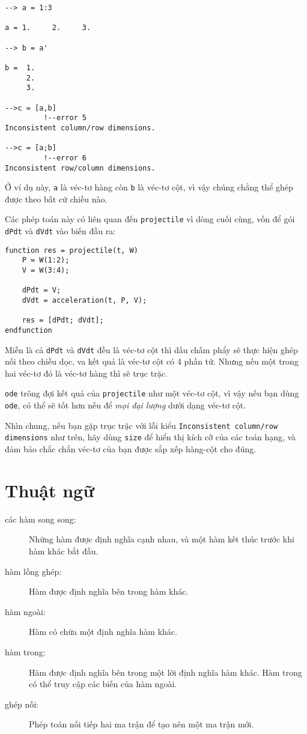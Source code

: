 \documentclass[12pt]{book}
\begin{document}
\begin{verbatim}
--> a = 1:3

a = 1.     2.     3.

--> b = a'

b =  1.
     2.
     3.

-->c = [a,b]
         !--error 5 
Inconsistent column/row dimensions.

-->c = [a;b]
         !--error 6 
Inconsistent row/column dimensions.
\end{verbatim}
%
Ở ví dụ này, {\tt a} là véc-tơ hàng còn {\tt b} là véc-tơ cột,
vì vậy chúng chẳng thể ghép được theo bất cứ chiều nào.

Các phép toán này có liên quan đến {\tt projectile} vì dòng cuối
cùng, vốn để gói {\tt dPdt} và {\tt dVdt} vào biến đầu ra:

\begin{verbatim}
function res = projectile(t, W)
    P = W(1:2);
    V = W(3:4);

    dPdt = V;                          
    dVdt = acceleration(t, P, V);

    res = [dPdt; dVdt];
endfunction
\end{verbatim}
%
Miễn là cả {\tt dPdt} và {\tt dVdt} đều là véc-tơ cột thì 
dấu chấm phẩy sẽ thực hiện ghép nối theo chiều dọc, va
kết quả là véc-tơ cột có 4 phần tử. Nhưng nếu một trong
hai véc-tơ đó là véc-tơ hàng thì sẽ trục trặc. 

{\tt ode} trông đợi kết quả của {\tt projectile} như một
véc-tơ cột, vì vậy nếu bạn dùng {\tt ode}, có thể sẽ tốt hơn
nếu để {\em mọi đại lượng} dưới dạng véc-tơ cột.

Nhìn chung, nếu bạn gặp trục trặc với lỗi kiểu 
{\tt Inconsistent column/row dimensions} như trên, 
hãy dùng {\tt size} để hiển thị kích cỡ của
các toán hạng, và đảm bảo chắc chắn véc-tơ của bạn được
sắp xếp hàng-cột cho đúng.


\section{Thuật ngữ}

\begin{description}

\item[các hàm song song:] Những hàm được định nghĩa cạnh nhau,
và một hàm kết thúc trước khi hàm khác bắt đầu.

\item[hàm lồng ghép:] Hàm được định nghĩa bên trong hàm khác.

\item[hàm ngoài:] Hàm có chứa một định nghĩa hàm khác.

\item[hàm trong:] Hàm được định nghĩa bên trong một lời định nghĩa
hàm khác. Hàm trong có thể truy cập các biến của hàm ngoài.

\item[ghép nối:] Phép toán nối tiếp hai ma trận để tạo nên một
ma trận mới.


\end{description}
\end{document}
